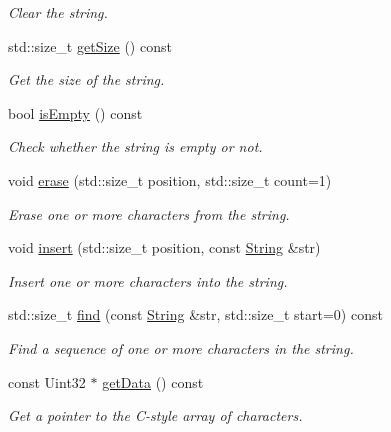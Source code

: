 \begin{DoxyCompactItemize}
\begin{DoxyCompactList}\small\item\em Clear the string. \end{DoxyCompactList}\item 
std\-::size\-\_\-t \hyperlink{classsf_1_1String_a635d75c4cd830d5f639a41815dd0ce23}{get\-Size} () const 
\begin{DoxyCompactList}\small\item\em Get the size of the string. \end{DoxyCompactList}\item 
bool \hyperlink{classsf_1_1String_a6c43f0cbe84cf17fa6ba93d58b75fcdc}{is\-Empty} () const 
\begin{DoxyCompactList}\small\item\em Check whether the string is empty or not. \end{DoxyCompactList}\item 
void \hyperlink{classsf_1_1String_aaa78a0a46b3fbe200a4ccdedc326eb93}{erase} (std\-::size\-\_\-t position, std\-::size\-\_\-t count=1)
\begin{DoxyCompactList}\small\item\em Erase one or more characters from the string. \end{DoxyCompactList}\item 
void \hyperlink{classsf_1_1String_ad0b1455deabf07af13ee79812e05fa02}{insert} (std\-::size\-\_\-t position, const \hyperlink{classsf_1_1String}{String} \&str)
\begin{DoxyCompactList}\small\item\em Insert one or more characters into the string. \end{DoxyCompactList}\item 
std\-::size\-\_\-t \hyperlink{classsf_1_1String_ae1fc8d6ced3b6082853f8013ea051b5c}{find} (const \hyperlink{classsf_1_1String}{String} \&str, std\-::size\-\_\-t start=0) const 
\begin{DoxyCompactList}\small\item\em Find a sequence of one or more characters in the string. \end{DoxyCompactList}\item 
const Uint32 $\ast$ \hyperlink{classsf_1_1String_af2d4e70869ebd38e225c6796e1325ae4}{get\-Data} () const 
\begin{DoxyCompactList}\small\item\em Get a pointer to the C-\/style array of characters. \end{DoxyCompactList}\item 

\end{DoxyCompactItemize}
